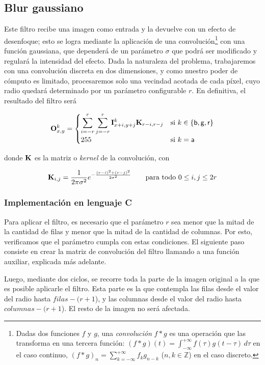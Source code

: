   \subsection{Blur gaussiano}
    Este filtro recibe una imagen como entrada y la devuelve con un efecto de desenfoque; esto se logra mediante la aplicación de una convolución\footnote{Dadas dos funciones $f$ y $g$, una \emph{convolución} $f * g$ es una operación que las transforma en una tercera función: $(f * g)(t) = \int_{-\infty}^{+\infty} f(\tau) g(t - \tau) \,d\tau$ en el caso continuo, $(f * g)_n = \sum_{k=-\infty}^{+\infty} f_k g_{n-k}$ ($n, k \in \mathbb{Z}$) en el caso discreto.} con una función gaussiana, que dependerá de un parámetro $\sigma$ que podrá ser modificado y regulará la intensidad del efecto. Dada la naturaleza del problema, trabajaremos con una convolución discreta en dos dimensiones, y como nuestro poder de cómputo es limitado, procesaremos solo una vecindad acotada de cada píxel, cuyo radio quedará determinado por un parámetro configurable $r$. En definitiva, el resultado del filtro será

    \[ \mathbf{O}_{x,y}^k = \begin{cases}
      \displaystyle \sum_{i=-r}^r \sum_{j=-r}^r \mathbf{I}_{x+i,y+j}^k \mathbf{K}_{r-i,r-j}
        & \text{si } k \in \lbrace \mathsf{b, g, r} \rbrace \\
      255
        & \text{si } k = \mathsf{a}
    \end{cases} \]

    donde $\mathbf{K}$ es la matriz o \emph{kernel} de la convolución, con

    \[ \mathbf{K}_{i,j} = \frac{1}{2 \pi \sigma^2} e^{- \frac{(r-i)^2 + (r-j)^2}{2 \sigma^2}} \qquad \text{para todo } 0 \leq i,j \leq 2r \]

    \subsubsection{Implementación en lenguaje C}

      Para aplicar el filtro, es necesario que el parámetro $r$ sea menor que la mitad de la cantidad de filas y menor que la mitad de la cantidad de columnas. Por esto, verificamos que el parámetro cumpla con estas condiciones. El siguiente paso consiste en crear la matriz de convolución del filtro llamando a una función auxiliar, explicada más adelante. 

      Luego, mediante dos ciclos, se recorre toda la parte de la imagen original a la que es posible aplicarle el filtro. Esta parte es la que contempla las filas desde el valor del radio hasta $filas - (r + 1$), y las columnas desde el valor del radio hasta $columnas - (r + 1$). El resto de la imagen no será afectada. 

